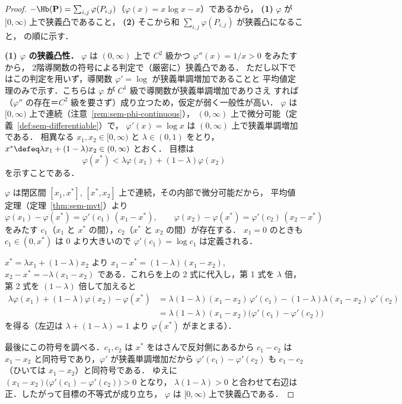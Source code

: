 \begin{proof}
  $-\Hb(\mathbf{P}) = \sum_{i,j}\varphi(P_{i,j})$（$\varphi(x) = x\log x - x$）であるから，
  \textbf{(1)} $\varphi$ が $[0,\infty)$ 上で狭義凸であること，
  \textbf{(2)} そこから和 $\sum_{i,j}\varphi(P_{i,j})$ が狭義凸になること，
  の順に示す．

  \textbf{(1) $\varphi$ の狭義凸性．}
  $\varphi$ は $(0,\infty)$ 上で $C^2$ 級かつ $\varphi''(x) = 1/x > 0$ をみたすから，
  2階導関数の符号による判定で（厳密に）狭義凸である．
  ただし以下ではこの判定を用いず，導関数 $\varphi' = \log$ が狭義単調増加であることと
  平均値定理のみで示す．こちらは $\varphi$ が $C^1$ 級で導関数が狭義単調増加でありさえ
  すれば（$\varphi''$ の存在＝$C^2$ 級を要さず）成り立つため，仮定が弱く一般性が高い．
  $\varphi$ は $[0,\infty)$ 上で連続（注意~\ref{rem:sem-phi-continuous}），
  $(0,\infty)$ 上で微分可能（定義~\ref{def:sem-differentiable}）で，
  $\varphi'(x) = \log x$ は $(0,\infty)$ 上で狭義単調増加である．
  相異なる $x_1, x_2 \in [0,\infty)$ と $\lambda \in (0,1)$ をとり，
  $x^* \defeq \lambda x_1 + (1-\lambda)x_2 \in (0,\infty)$ とおく．
  目標は
  \[
    \varphi(x^*) < \lambda\varphi(x_1) + (1-\lambda)\varphi(x_2)
  \]
  を示すことである．

  $\varphi$ は閉区間 $[x_1, x^*]$, $[x^*, x_2]$ 上で連続，その内部で微分可能だから，
  平均値定理（定理~\ref{thm:sem-mvt}）より
  \[
    \varphi(x_1) - \varphi(x^*) = \varphi'(c_1)\,(x_1 - x^*),
    \qquad
    \varphi(x_2) - \varphi(x^*) = \varphi'(c_2)\,(x_2 - x^*)
  \]
  をみたす $c_1$（$x_1$ と $x^*$ の間），$c_2$（$x^*$ と $x_2$ の間）が存在する．
  $x_1 = 0$ のときも $c_1 \in (0, x^*)$ は $0$ より大きいので $\varphi'(c_1) = \log c_1$ は定義される．

  $x^* = \lambda x_1 + (1-\lambda)x_2$ より
  $x_1 - x^* = (1-\lambda)(x_1 - x_2)$,
  $x_2 - x^* = -\lambda(x_1 - x_2)$
  である．これらを上の 2 式に代入し，第 1 式を $\lambda$ 倍，第 2 式を $(1-\lambda)$ 倍して加えると
  \begin{align*}
    \lambda\varphi(x_1) + (1-\lambda)\varphi(x_2) - \varphi(x^*)
    &= \lambda(1-\lambda)(x_1 - x_2)\,\varphi'(c_1)
       - (1-\lambda)\lambda(x_1 - x_2)\,\varphi'(c_2) \\
    &= \lambda(1-\lambda)(x_1 - x_2)\bigl(\varphi'(c_1) - \varphi'(c_2)\bigr)
  \end{align*}
  を得る（左辺は $\lambda + (1-\lambda) = 1$ より $\varphi(x^*)$ がまとまる）．

  最後にこの符号を調べる．$c_1, c_2$ は $x^*$ をはさんで反対側にあるから
  $c_1 - c_2$ は $x_1 - x_2$ と同符号であり，$\varphi'$ が狭義単調増加だから
  $\varphi'(c_1) - \varphi'(c_2)$ も $c_1 - c_2$（ひいては $x_1 - x_2$）と同符号である．
  ゆえに $(x_1 - x_2)\bigl(\varphi'(c_1) - \varphi'(c_2)\bigr) > 0$ となり，
  $\lambda(1-\lambda) > 0$ と合わせて右辺は正．したがって目標の不等式が成り立ち，
  $\varphi$ は $[0,\infty)$ 上で狭義凸である．


\end{proof}

